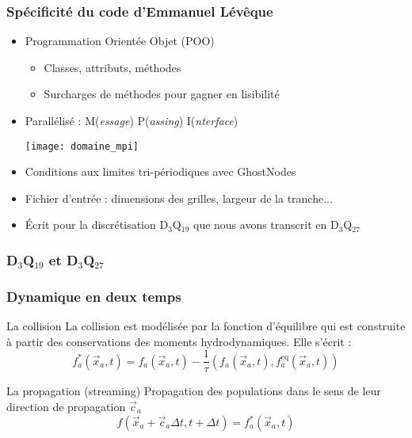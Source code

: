 \documentclass[12pt, xcolor=svgnames]{beamer}
\newcommand{\bwarrow}{\item[\color{DarkRed} \ding{227}]}
\newcommand{\warrow}{\item[\color{blue!50!black!70} \tiny{\ding{109}}]}
\newcommand{\bepar}[1]{
	\left( #1 \right)  
}
\begin{document}
\begin{frame}
\frametitle{Spécificité du code d'Emmanuel Lévêque}
\begin{itemize}
	\bwarrow Programmation Orientée Objet (POO) 
		\begin{itemize}
			\warrow Classes, attributs, méthodes
			\warrow Surcharges de méthodes pour gagner en lisibilité
		\end{itemize}
	\bwarrow Parallélisé : M(\small{\textit{essage}}) P(\small{\textit{assing}}) I(\small{\textit{nterface}}) 	
	\begin{center} \texttt{[image: domaine\_mpi]} \end{center}
	\bwarrow Conditions aux limites tri-périodiques	avec GhostNodes
	\bwarrow Fichier d'entrée : dimensions des grilles, largeur de la tranche...
	\bwarrow Écrit pour la discrétisation D$_3$Q$_{19}$ que nous avons transcrit en D$_3$Q$_{27}$
	
\end{itemize}
\end{frame}

\begin{frame}
\frametitle{ D$_3$Q$_{19}$ et  D$_3$Q$_{27}$}
\begin{center}

\end{center}
\end{frame}


\begin{frame}
\frametitle{Dynamique en deux temps}
\begin{block}{La collision}
La collision est modélisée par la fonction d'équilibre qui est construite à partir des conservations des moments hydrodynamiques. Elle s'écrit :
 \begin{equation*}
 f^*_a\bepar{\vec{x}_a ,t} = f_a\bepar{\vec{x}_a ,t} - \dfrac{1}{\tau}\bepar{f_a\bepar{\vec{x}_a ,t}, f_a^{\text{eq}}\bepar{\vec{x}_a ,t}}
 \end{equation*}
\end{block}

\begin{block}{La propagation (streaming)}
Propagation des populations dans le sens de leur direction de propagation $\vec{c}_a$
\begin{equation*}
f\left(\vec{x}_a + \vec{c}_a\Delta t,t + \Delta t\right) = f^*_a\bepar{\vec{x}_a ,t}
\end{equation*}

\end{block}
 
\end{frame}
\end{document}
